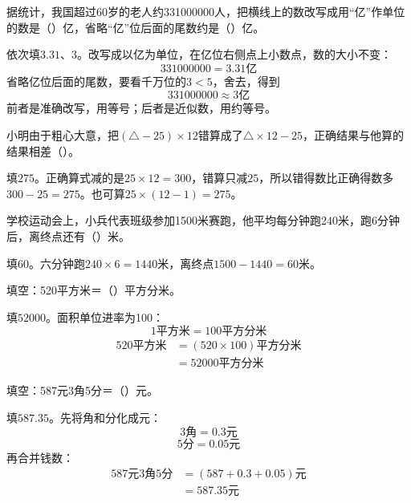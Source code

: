 据统计，我国超过60岁的老人约331000000人，把横线上的数改写成用“亿”作单位的数是（\hspace{1.8em}）亿，省略“亿”位后面的尾数约是（\hspace{1.8em}）亿。\par
\begin{BookAnswer}
依次填\(3.31\)、\(3\)。改写成以亿为单位，在亿位右侧点上小数点，数的大小不变：\[331000000=3.31\text{亿}\]省略亿位后面的尾数，要看千万位的\(3<5\)，舍去，得到\[331000000\approx3\text{亿}\]前者是准确改写，用等号；后者是近似数，用约等号。
\end{BookAnswer}

小明由于粗心大意，把\((\triangle-25)\times12\)错算成了\(\triangle\times12-25\)，正确结果与他算的结果相差（\hspace{1.8em}）。\par
\begin{BookAnswer}
填\(275\)。正确算式减的是\(25\times12=300\)，错算只减\(25\)，所以错得数比正确得数多\(300-25=275\)。也可算\(25\times(12-1)=275\)。
\end{BookAnswer}

学校运动会上，小兵代表班级参加1500米赛跑，他平均每分钟跑240米，跑6分钟后，离终点还有（\hspace{1.8em}）米。\par
\begin{BookAnswer}
填\(60\)。六分钟跑\(240\times6=1440\)米，离终点\(1500-1440=60\)米。
\end{BookAnswer}

填空：520平方米＝（\hspace{1.8em}）平方分米。\par
\begin{BookAnswer}
填\(52000\)。面积单位进率为100：\[1\text{平方米}=100\text{平方分米}\]\[\begin{aligned}520\text{平方米}&=(520\times100)\text{平方分米}\\&=52000\text{平方分米}\end{aligned}\]
\end{BookAnswer}

填空：587元3角5分＝（\hspace{1.8em}）元。\par
\begin{BookAnswer}
填\(587.35\)。先将角和分化成元：\[3\text{角}=0.3\text{元}\]\[5\text{分}=0.05\text{元}\]再合并钱数：\[\begin{aligned}587\text{元}3\text{角}5\text{分}&=(587+0.3+0.05)\text{元}\\&=587.35\text{元}\end{aligned}\]
\end{BookAnswer}

